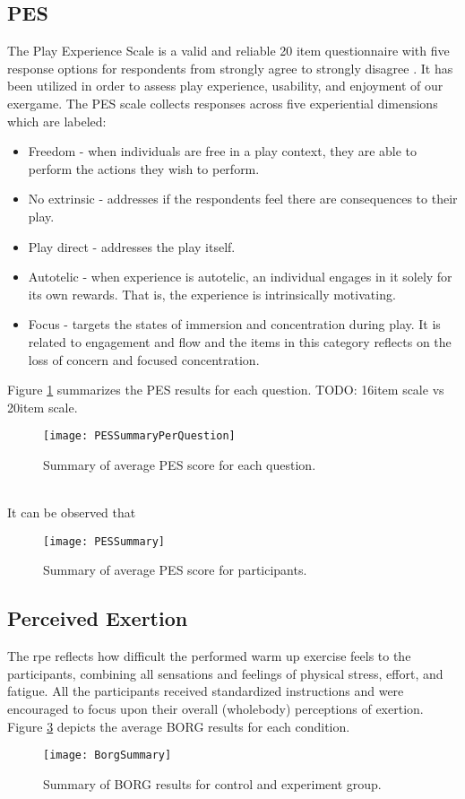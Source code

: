 \subsection{PES}
The Play Experience Scale is a valid and reliable 20 item questionnaire with five response options for respondents from strongly agree to strongly disagree \cite{pavlas2012play}. It has been utilized in order to assess play experience, usability, and enjoyment of our exergame. The PES scale collects responses across five experiential dimensions which are labeled: \begin{itemize}
\item Freedom - when individuals are free in a play context, they are able to perform the actions they wish to perform.
\item No extrinsic - addresses if the respondents feel there are consequences to their play.
\item Play direct - addresses the play itself.
\item Autotelic - when experience is autotelic, an individual engages in it solely for its own rewards. That is, the experience is intrinsically motivating.
\item Focus - targets the states of immersion and concentration during play. It is related to engagement and flow and the items in this category  reflects on the loss of concern and focused concentration.
\end{itemize}
Figure \ref{fig:pesPerQuestion} summarizes the PES results for each question. TODO: 16item scale vs 20item scale. \pagebreak
\begin{figure}[h]
    \centering
    \texttt{[image: PESSummaryPerQuestion]}
    \caption{Summary of average PES score for each question.}
    \label{fig:pesPerQuestion}
\end{figure}\\
It can be observed that 
\begin{figure}[h]
    \centering
    \texttt{[image: PESSummary]}
    \caption{Summary of average PES score for participants.}
    \label{fig:pes}
\end{figure}


\subsection{Perceived Exertion}
The \gls{rpe} reflects how difficult the performed warm up exercise feels to the participants, combining all sensations and feelings of physical stress, effort, and fatigue. All the participants received standardized instructions and were encouraged to focus upon their overall (wholebody) perceptions of exertion.
Figure \ref{fig:borg} depicts the average BORG results for each condition.\\
\begin{figure}[h]
    \centering
    \texttt{[image: BorgSummary]}
    \caption{Summary of BORG results for control and experiment group.}
    \label{fig:borg}
\end{figure}\pagebreak

